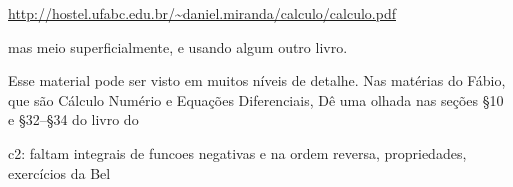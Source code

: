 \documentclass[oneside,12pt]{article}
\begin{document}
{\footnotesize

\url{http://hostel.ufabc.edu.br/~daniel.miranda/calculo/calculo.pdf}

}

\ssk

mas meio superficialmente, e usando algum outro livro.

Esse material pode ser visto em muitos níveis de detalhe. Nas matérias
do Fábio, que são Cálculo Numério e Equações Diferenciais, Dê uma
olhada nas seções §10 e §32--§34 do livro do




c2: faltam integrais de funcoes negativas e na ordem reversa, propriedades,
exercícios da Bel











\end{document}
